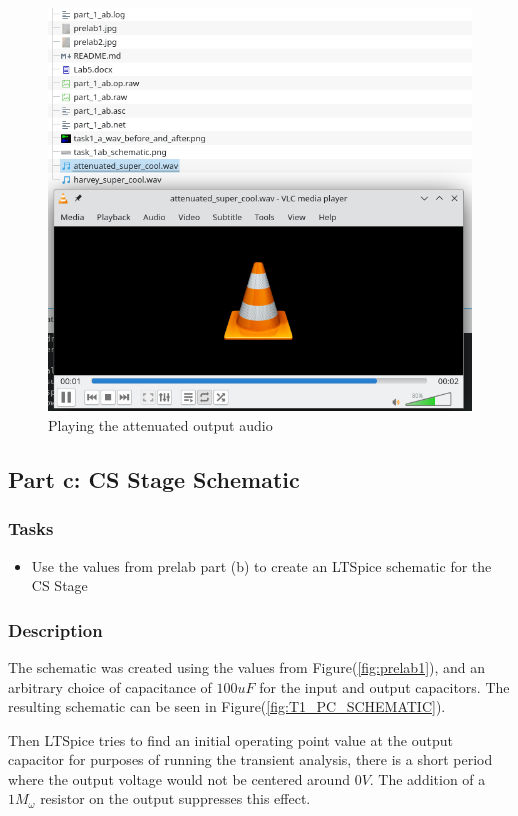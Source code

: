 \documentclass[11pt]{article}
\begin{document}
	\begin{figure}[h]
		\centering
		\includegraphics[width=0.85\linewidth]{task_1_b_play_attenuated}
		\caption{Playing the attenuated output audio}
		\label{fig:T1_PA_PLAYER}
		\vspace{1mm}
	\end{figure}


	\subsection{Part c: CS Stage Schematic}
	
	\subsubsection{Tasks}
	\begin{itemize}
		\item Use the values from prelab part (b) to create an LTSpice schematic for the CS Stage
	\end{itemize}
	
	\subsubsection{Description}
		The schematic was created using the values from Figure(\ref{fig:prelab1}), and an arbitrary choice of capacitance of $100uF$ for the input and output capacitors. The resulting schematic can be seen in Figure(\ref{fig:T1_PC_SCHEMATIC}).
		
		Then LTSpice tries to find an initial operating point value at the output capacitor for purposes of running the transient analysis, there is a short period where the output voltage would not be centered around $0V$. The addition of a $1M_\omega$ resistor on the output suppresses this effect.
		
\end{document}
